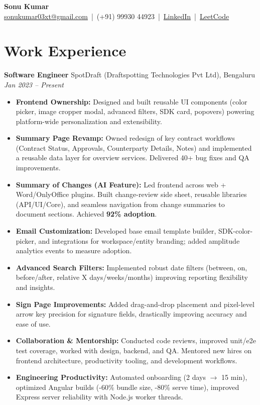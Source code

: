 \documentclass[a4paper,10pt]{article}
\begin{document}
\begin{center}
    {\LARGE \textbf{Sonu Kumar}} \\[4pt]
    \href{mailto:sonukumar03xt@gmail.com}{sonukumar03xt@gmail.com} \,|\, (+91) 99930 44923 \,|\, 
    \href{https://www.linkedin.com/in/sonukumar03xt}{LinkedIn} \,|\, 
    \href{https://leetcode.com/sonukumar03xt}{LeetCode}
\end{center}

\section*{Work Experience}

\textbf{Software Engineer} \hfill SpotDraft (Draftspotting Technologies Pvt Ltd), Bengaluru \\
\textit{Jan 2023 -- Present}
\begin{itemize}
    \item \textbf{Frontend Ownership:} Designed and built reusable UI components (color picker, image cropper modal, advanced filters, SDK card, popovers) powering platform-wide personalization and extensibility.
    \item \textbf{Summary Page Revamp:} Owned redesign of key contract workflows (Contract Status, Approvals, Counterparty Details, Notes) and implemented a reusable data layer for overview services. Delivered 40+ bug fixes and QA improvements.
    \item \textbf{Summary of Changes (AI Feature):} Led frontend across web + Word/OnlyOffice plugins. Built change-review side sheet, reusable libraries (API/UI/Core), and seamless navigation from change summaries to document sections. Achieved \textbf{92\% adoption}.
    \item \textbf{Email Customization:} Developed base email template builder, SDK-color-picker, and integrations for workspace/entity branding; added amplitude analytics events to measure adoption.
    \item \textbf{Advanced Search Filters:} Implemented robust date filters (between, on, before/after, relative X days/\allowbreak weeks/\allowbreak months) improving reporting flexibility and insights.
    \item \textbf{Sign Page Improvements:} Added drag-and-drop placement and pixel-level arrow key precision for signature fields, drastically improving accuracy and ease of use.
    \item \textbf{Collaboration \& Mentorship:} Conducted code reviews, improved unit/e2e test coverage, worked with design, backend, and QA. Mentored new hires on frontend architecture, productivity tooling, and development workflows.
    \item \textbf{Engineering Productivity:} Automated onboarding (2 days $\rightarrow$ 15 min), optimized Angular builds (-60\% bundle size, -80\% serve time), improved Express server reliability with Node.js worker threads.
\end{itemize}
\end{document}
